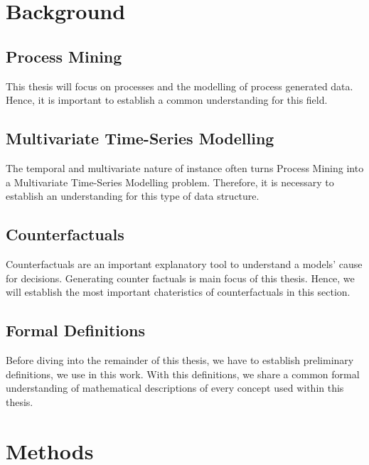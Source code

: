 \documentclass[12pt,a4paper]{report}
\begin{document}
\chapter{Background}
\label{ch:prereq}

\section{Process Mining}
\label{sec:process}
This thesis will focus on processes and the modelling of process generated data. Hence, it is important to establish a common understanding for this field.



\section{Multivariate Time-Series Modelling}
\label{sec:sequences}
The temporal and multivariate nature of \gls{instance} often turns Process Mining into a Multivariate Time-Series Modelling problem. Therefore, it is necessary to establish an understanding for this type of data structure.



\section{Counterfactuals}
\label{sec:counterfactuals}
Counterfactuals are an important explanatory tool to understand a models' cause for decisions. Generating counter factuals is main focus of this thesis. Hence, we will establish the most important chateristics of counterfactuals in this section.



\section{Formal Definitions}
\label{sec:formulas}
Before diving into the remainder of this thesis, we have to establish preliminary definitions, we use in this work. With this definitions, we share a common formal understanding of mathematical descriptions of every concept used within this thesis. 








\chapter{Methods}
\label{sec:methods}
\end{document}
